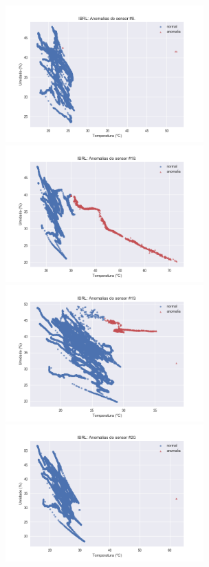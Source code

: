 \documentclass[cic,tc]{iiufrgs}
\begin{document}
\begin{figure}
\begin{adjustwidth}{-1in}{-.8in}
\includegraphics[width=0.68\textwidth]{IBRL_8.png}
\includegraphics[width=0.68\textwidth]{IBRL_18.png}
\includegraphics[width=0.68\textwidth]{IBRL_19.png}
\includegraphics[width=0.68\textwidth]{IBRL_20.png}

\end{adjustwidth}
\end{figure}
\end{document}

